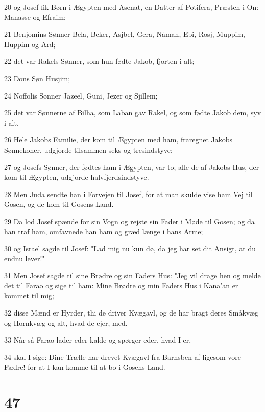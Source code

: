 \par 20 og Josef fik Børn i Ægypten med Asenat, en Datter af Potifera, Præsten i On: Manasse og Efraim;
\par 21 Benjomins Sønner Bela, Beker, Asjbel, Gera, Nåman, Ebi, Rosj, Muppim, Huppim og Ard;
\par 22 det var Rakels Sønner, som hun fødte Jakob, fjorten i alt;
\par 23 Dons Søn Husjim;
\par 24 Noffolis Sønner Jazeel, Guni, Jezer og Sjillem;
\par 25 det var Sønnerne af Bilha, som Laban gav Rakel, og som fødte Jakob dem, syv i alt.
\par 26 Hele Jakobs Familie, der kom til Ægypten med ham, fraregnet Jakobs Sønnekoner, udgjorde tilsammen seks og tresindstyve;
\par 27 og Josefs Sønner, der fødtes ham i Ægypten, var to; alle de af Jakobs Hus, der kom til Ægypten, udgjorde halvfjerdsindstyve.
\par 28 Men Juda sendte han i Forvejen til Josef, for at man skulde vise ham Vej til Gosen, og de kom til Gosens Land.
\par 29 Da lod Josef spænde for sin Vogn og rejste sin Fader i Møde til Gosen; og da han traf ham, omfavnede han ham og græd længe i hans Arme;
\par 30 og Israel sagde til Josef: "Lad mig nu kun dø, da jeg har set dit Ansigt, at du endnu lever!"
\par 31 Men Josef sagde til sine Brødre og sin Faders Hus: "Jeg vil drage hen og melde det til Farao og sige til ham: Mine Brødre og min Faders Hus i Kana'an er kommet til mig;
\par 32 disse Mænd er Hyrder, thi de driver Kvægavl, og de har bragt deres Småkvæg og Hornkvæg og alt, hvad de ejer, med.
\par 33 Når så Farao lader eder kalde og spørger eder, hvad I er,
\par 34 skal I sige: Dine Trælle har drevet Kvægavl fra Barnsben af ligesom vore Fædre! for at I kan komme til at bo i Gosens Land.

\chapter{47}


